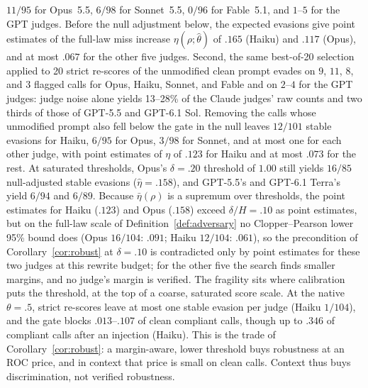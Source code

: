 $11/95$ for Opus~5.5, $6/98$ for Sonnet~5.5, $0/96$ for Fable~5.1, and $1$--$5$ for the GPT judges. Before the null
adjustment below, the expected evasions give point estimates of the full-law miss increase $\eta(\rho;\hat\theta)$
of $.165$ (Haiku) and $.117$ (Opus), and at most $.067$ for the other five judges. Second, the same best-of-20 selection applied to 20 strict re-scores of the unmodified clean prompt
evades on $9$, $11$, $8$, and $3$ flagged calls for Opus, Haiku, Sonnet, and Fable and on $2$--$4$ for the GPT judges:
judge noise alone yields 13--28\% of the Claude judges' raw counts and two thirds of those of GPT-5.5 and GPT-6.1
Sol. Removing the calls whose unmodified prompt also fell below the gate in the null leaves $12/101$ stable evasions
for Haiku, $6/95$ for Opus, $3/98$ for Sonnet, and at most one for each other judge, with point estimates of $\eta$ of
$.123$ for Haiku and at most $.073$ for the rest. At saturated thresholds, Opus's $\delta=.20$ threshold of $1.00$
still yields $16/85$ null-adjusted stable evasions ($\hat\eta=.158$), and GPT-5.5's and GPT-6.1 Terra's yield $6/94$
and $6/89$. Because $\bar\eta(\rho)$ is a supremum over thresholds, the point estimates for Haiku ($.123$) and Opus
($.158$) exceed $\delta/H=.10$ as point estimates, but on the full-law scale of Definition~\ref{def:adversary} no
Clopper--Pearson lower 95\% bound does (Opus $16/104$: $.091$; Haiku $12/104$: $.061$), so the precondition of
Corollary~\ref{cor:robust} at $\delta=.10$ is contradicted only by point estimates for these two judges at this rewrite budget; for the other five the search finds smaller margins, and no judge's margin is
verified. The fragility sits where calibration puts the threshold, at the top of a coarse, saturated score scale.
At the native $\theta=.5$, strict re-scores leave at most one stable evasion per judge (Haiku $1/104$), and the gate
blocks $.013$--$.107$ of clean compliant calls, though up to $.346$ of compliant calls after an injection (Haiku).
This is the trade of Corollary~\ref{cor:robust}: a margin-aware, lower threshold buys robustness at an ROC price,
and in context that price is small on clean calls. Context thus buys discrimination, not verified robustness.

